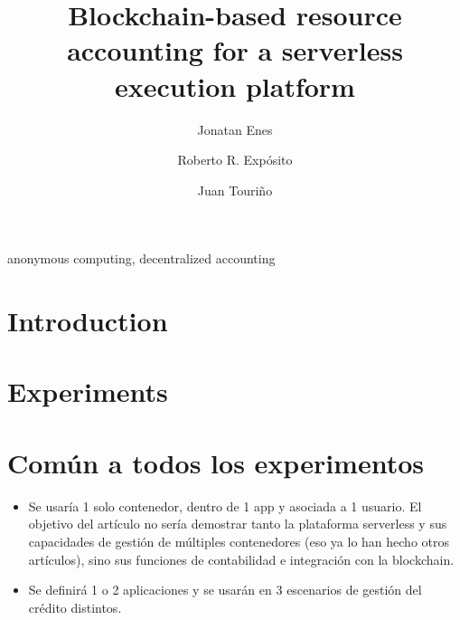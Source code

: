 \documentclass[preprint,3p]{elsarticle}
\begin{document}
\begin{frontmatter}

\title{
	Blockchain-based resource accounting for a serverless execution platform
}

\author{Jonatan Enes}
\author{Roberto R. Exp\'osito}
\author{Juan Touri\~no}

\address{Universidade da Coru\~na, CITIC, Computer Architecture Group, Campus de A Coru\~na, Spain}


\begin{abstract}

\end{abstract}

\begin{keyword}
anonymous computing, decentralized accounting
\end{keyword}

\end{frontmatter}

\linenumbers

\section{Introduction}
\label{sec:intro}

\section{Experiments}
\label{sec:experiments}

\section{Común a todos los experimentos}

\begin{itemize}
	\item Se usaría 1 solo contenedor, dentro de 1 app y asociada a 1 usuario. El objetivo del artículo no sería demostrar tanto la plataforma serverless y sus capacidades de gestión de múltiples contenedores (eso ya lo han hecho otros artículos), sino sus funciones de contabilidad e integración con la blockchain.
	
	\item Se definirá 1 o 2 aplicaciones y se usarán en 3 escenarios de gestión del crédito distintos.
\end{itemize}
\end{document}
